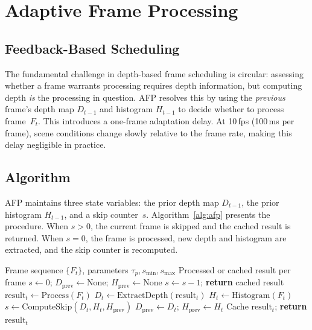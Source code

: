 \documentclass[conference]{IEEEtran}
\begin{document}
\section{Adaptive Frame Processing}
\label{sec:afp}

\subsection{Feedback-Based Scheduling}

The fundamental challenge in depth-based frame scheduling is
circular: assessing whether a frame warrants processing requires
depth information, but computing depth \emph{is} the processing in
question. AFP resolves this by using the \emph{previous} frame's
depth map $D_{t-1}$ and histogram $H_{t-1}$ to decide whether to
process frame~$F_t$. This introduces a one-frame adaptation delay.
At 10\,fps (100\,ms per frame), scene conditions change slowly
relative to the frame rate, making this delay negligible in
practice.

\subsection{Algorithm}

AFP maintains three state variables: the prior depth map
$D_{t-1}$, the prior histogram $H_{t-1}$, and a skip counter~$s$.
Algorithm~\ref{alg:afp} presents the procedure. When $s > 0$, the
current frame is skipped and the cached result is returned. When
$s = 0$, the frame is processed, new depth and histogram are
extracted, and the skip counter is recomputed.

\begin{algorithm}[t]
  \caption{Adaptive Frame Processing (AFP)}
  \label{alg:afp}
  \begin{algorithmic}[1]
    \REQUIRE Frame sequence $\{F_t\}$, parameters
      $\tau_p, s_\text{min}, s_\text{max}$
    \ENSURE Processed or cached result per frame
    \STATE $s \leftarrow 0$;
      $D_\text{prev} \leftarrow \text{None}$;
      $H_\text{prev} \leftarrow \text{None}$
        \STATE $s \leftarrow s - 1$;
          \textbf{return} cached result
      \ENDIF
      \STATE $\text{result}_t \leftarrow \text{Process}(F_t)$
      \STATE $D_t \leftarrow \text{ExtractDepth}(\text{result}_t)$
      \STATE $H_t \leftarrow \text{Histogram}(F_t)$
      \STATE $s \leftarrow \text{ComputeSkip}(D_t, H_t,
        H_\text{prev})$
      \STATE $D_\text{prev} \leftarrow D_t$;\;
        $H_\text{prev} \leftarrow H_t$
      \STATE Cache $\text{result}_t$;\;
        \textbf{return} $\text{result}_t$
    \ENDFOR
  \end{algorithmic}
\end{algorithm}
\end{document}
